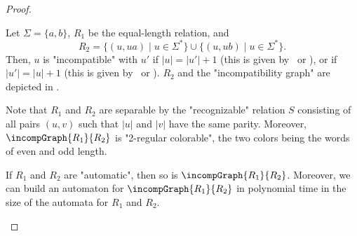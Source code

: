 \begin{proof}
\begin{example}
    \AP\label{ex:equal-length-plusone}%
    \begin{marginfigure}%
        \centering
        \begin{tikzpicture}
            
        \end{tikzpicture}
        \caption{\AP\label{fig:equal-length-plusone-relation}%
            The relation $R_2$ of ,
            restricted to words of length at most 2.
        }
    \end{marginfigure}%
    \begin{marginfigure}%
        \centering
        \begin{tikzpicture}
            
        \end{tikzpicture}
        \caption{\AP\label{fig:equal-length-plusone-incompatibility}%
            Incompatibility graph $\incompGraph{R_1}{R_2}$ and its "2-regular coloring".%
        }
    \end{marginfigure}%
    Let $\Sigma = \{a,b\}$, $R_1$ be the equal-length relation,
    and
    \[
        R_2 = \{(u, ua) \mid u \in \Sigma^*\} \cup \{(u, ub) \mid u \in \Sigma^*\}.
    \]
    Then, $u$ is "incompatible" with $u'$ if $|u| = |u'|+1$ (this is given by \compL~or \compR),
    or if $|u'| = |u|+1$ (this is given by \compLpr~or \compRpr).
    $R_2$ and the "incompatibility graph" are depicted in .
    
    Note that $R_1$ and $R_2$ are separable by the "recognizable" relation
    $S$ consisting of all pairs $(u,v)$ such that $|u|$ and $|v|$ have the same parity.
    Moreover, $\incompGraph{R_1}{R_2}$ is "2-regular colorable", the two colors being
    the words of even and odd length.
\end{example}

\begin{lemma}
    \AP\label{lem:incomp-is-automatic}
    If $R_1$ and $R_2$ are "automatic", then so is $\incompGraph{R_1}{R_2}$.
    Moreover, we can build an automaton for $\incompGraph{R_1}{R_2}$ in polynomial time in the size of the automata for $R_1$ and $R_2$.
\end{lemma}


\end{proof}
